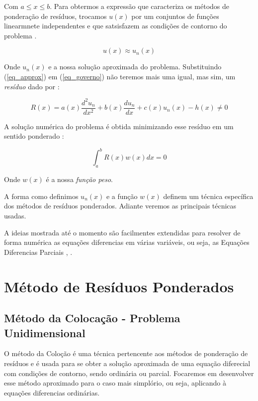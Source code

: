 \documentclass[a4paper, 12pt]{article}
\numberwithin{equation}{section}
\begin{document}
Com $a \leq x \leq b $. Para obtermos a expressão que caracteriza os métodos de ponderação de resíduos, trocamos $u(x)$ por um conjuntos de funções linearmnete independentes e que satsisfazem as condições de contorno do problema \citep{zienkiewicz2006finite}. 

\begin{equation}
    u(x) \approx u_n(x)  \label{eq_approx}
\end{equation}

Onde $u_n(x)$ e a nossa solução aproximada do problema. Substituindo (\ref{eq_approx}) em (\ref{eq_governo}) não teremos mais uma igual, mas sim, um \textit{resíduo} dado por : 

\begin{equation}
    R(x) = a(x) \dfrac{d^2u_n}{dx^2} + b(x)\dfrac{du_n}{dx} + c(x)u_n(x)  - h(x) \neq 0 \label{residuo}
\end{equation}

A solução numérica do problema é obtida minimizando esse resíduo em um sentido ponderado : 

\begin{equation}
    \int_{a}^{b} R(x) w(x) dx = 0 \label{minimizacao}
\end{equation}

Onde $w(x)$ é a nossa \textit{função peso}. 

A forma como definimos $u_n(x)$ e a função $w(x)$ definem um técnica específica dos métodos de resíduos ponderados. Adiante veremos as principais técnicas usadas. 


\begin{tcolorbox}[colback=gray!10!white, colframe=red!40!black, title={ Observação}]
A ideias mostrada até o momento são facilmentes extendidas para resolver de forma numérica as equações diferencias em várias variáveis, ou seja, as Equações Diferencias Parciais \citep{zienkiewicz2006finite}, \citep{farlow1993partial}.

\end{tcolorbox}

\newpage

\section{Método de Resíduos Ponderados}

\subsection{Método da Colocação - Problema Unidimensional}
O método da Coloção é uma técnica pertencente aos métodos de ponderação de resíduos e é usada para se obter a solução aproximada de uma equação diferecial com condições de contorno, sendo ordinária ou parcial. Focaremos em desenvolver esse método aproximado para o caso mais simplório, ou seja, aplicando à equações diferencias ordinárias. 
\end{document}
